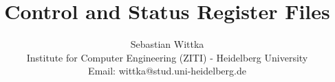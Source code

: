 \documentclass[a4paper,12pt,technote]{IEEEtran}
\begin{document}
%

%
%




%



%
\title{Control and Status Register Files}
\author{Sebastian Wittka\\
Institute for Computer Engineering (ZITI) - Heidelberg University\\
Email: wittka@stud.uni-heidelberg.de}
\twocolumn[
\begin{@twocolumnfalse}
\maketitle
\end{@twocolumnfalse}]




%


\end{document}
